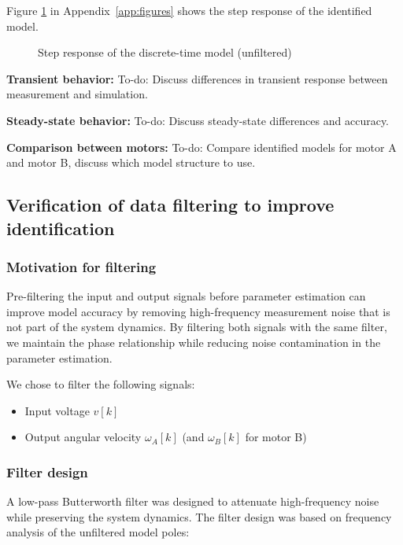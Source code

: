 \documentclass{article}
\begin{document}
	Figure \ref{fig:step_unfiltered} in Appendix~\ref{app:figures} shows the step response of the identified model.
	
	\begin{figure}[h]
		\centering
		\caption{Step response of the discrete-time model (unfiltered)}
		\label{fig:step_unfiltered}
	\end{figure}
	
	\textbf{Transient behavior:} To-do: Discuss differences in transient response between measurement and simulation.
	
	\textbf{Steady-state behavior:} To-do: Discuss steady-state differences and accuracy.
	
	\textbf{Comparison between motors:} To-do: Compare identified models for motor A and motor B, discuss which model structure to use.
	
	\subsection{Verification of data filtering to improve identification}
	
	\subsubsection{Motivation for filtering}
	
	Pre-filtering the input and output signals before parameter estimation can improve model accuracy by removing high-frequency measurement noise that is not part of the system dynamics. By filtering both signals with the same filter, we maintain the phase relationship while reducing noise contamination in the parameter estimation.
	
	We chose to filter the following signals:
	\begin{itemize}
		\item Input voltage $v[k]$
		\item Output angular velocity $\omega_A[k]$ (and $\omega_B[k]$ for motor B)
	\end{itemize}
	
	\subsubsection{Filter design}
	
	A low-pass Butterworth filter was designed to attenuate high-frequency noise while preserving the system dynamics. The filter design was based on frequency analysis of the unfiltered model poles:
	
\end{document}
